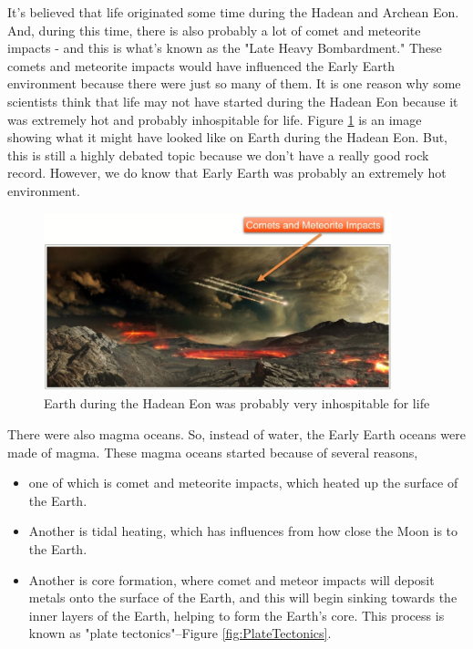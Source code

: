 \documentclass[]{article}
\begin{document}
It's believed that life originated
some time during the Hadean
and Archean Eon.
And, during this time,
there is also probably a lot of comet
and meteorite impacts -
and this is what's known as
the "Late Heavy Bombardment."
These comets and meteorite impacts
would have influenced
the Early Earth environment
because there were just so many of them.
It is one reason why some scientists think
that life may not have started
during the Hadean Eon
because it was extremely hot
and probably inhospitable for life.
Figure \ref{fig:HadeanInhospitable} is an image showing
what it might have looked like on Earth
during the Hadean Eon.
But, this is still a highly debated topic
because we don't have
a really good rock record.
However, we do know that Early Earth
was probably an extremely hot
environment.
\begin{figure}[H]
	\caption[Earth during the Hadean Eon was probably very inhospitable]{Earth during the Hadean Eon was probably very inhospitable for life} \label{fig:HadeanInhospitable}
	\includegraphics[width=0.9\textwidth]{HadeanInhospitable}
\end{figure}

There were also magma oceans.
So, instead of water,
the Early Earth oceans
were made of magma.
These magma oceans started
because of several reasons,
\begin{itemize}
	\item one of which is comet and meteorite impacts, which heated up the surface of the Earth.
	\item Another is tidal heating, which has influences from how close the Moon is to the Earth.
	\item Another is core formation,
	where comet and meteor impacts
	will deposit metals
	onto the surface of the Earth,
	and this will begin sinking
	towards the inner layers of the Earth,
	helping to form the Earth's core.
	This process is known
	as "plate tectonics"--Figure \ref{fig:PlateTectonics}.
\end{itemize}
\end{document}
